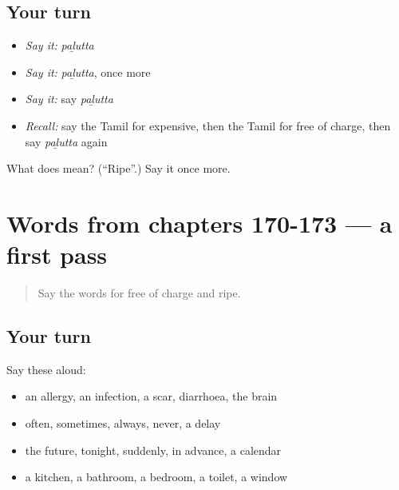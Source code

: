 \subsection*{Your turn}
\begin{itemize}
\raggedright
  \item \emph{Say it:} \emph{paḻutta}
  \item \emph{Say it:} \emph{paḻutta}, once more
  \item \emph{Say it:} say \emph{paḻutta}
  \item \emph{Recall:} say the Tamil for expensive, then the Tamil for free of charge, then say \emph{paḻutta} again
\end{itemize}

\begin{tcolorbox}[breakable,colback=teal!4,colframe=teal!35!black,title={Before you move on}]
What does  mean? (\textquotedblleft{}Ripe\textquotedblright{}.) Say it once more.
\end{tcolorbox}
\section[(dialogue)]{Words from chapters 170-173 — a first pass}

\label{lesson:TA-R178-first-pass-words-from-chapters-170-173}



\begin{quote}
Say the words for free of charge and ripe.
\end{quote}

\subsection*{Your turn}
Say these aloud:

\begin{itemize}
\raggedright
  \item an allergy, an infection, a scar, diarrhoea, the brain
  \item often, sometimes, always, never, a delay
  \item the future, tonight, suddenly, in advance, a calendar
  \item a kitchen, a bathroom, a bedroom, a toilet, a window
\end{itemize}

